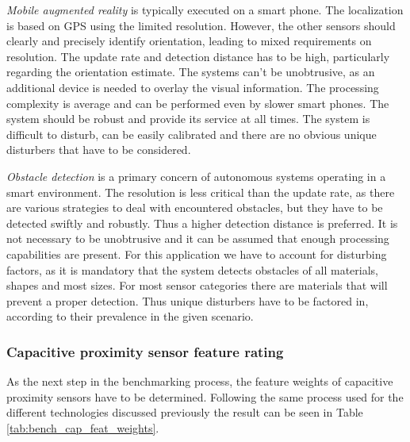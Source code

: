 \emph{Mobile augmented reality} is typically executed on a smart phone. The localization is based on GPS using the limited resolution. However, the other sensors should clearly and precisely identify orientation, leading to mixed requirements on resolution. The update rate and detection distance has to be high, particularly regarding the orientation estimate. The systems can't be unobtrusive, as an additional device is needed to overlay the visual information. The processing complexity is average and can be performed even by slower smart phones. The system should be robust and provide its service at all times. The system is difficult to disturb, can be easily calibrated and there are no obvious unique disturbers that have to be considered.

\emph{Obstacle detection} is a primary concern of autonomous systems operating in a smart environment. The resolution is less critical than the update rate, as there are various strategies to deal with encountered obstacles, but they have to be detected swiftly and robustly. Thus a higher detection distance is preferred. It is not necessary to be unobtrusive and it can be assumed that enough processing capabilities are present. For this application we have to account for disturbing factors, as it is mandatory that the system detects obstacles of all materials, shapes and most sizes. For most sensor categories there are materials that will prevent a proper detection. Thus unique disturbers have to be factored in, according to their prevalence in the given scenario.

\subsubsection*{Capacitive proximity sensor feature rating}
As the next step in the benchmarking process, the feature weights of capacitive proximity sensors have to be determined. Following the same process used for the different technologies discussed previously the result can be seen in Table \ref{tab:bench_cap_feat_weights}.

